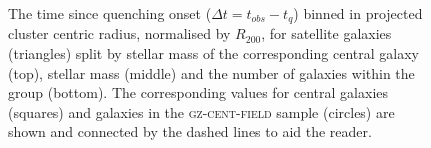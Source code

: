 \begin{figure}
{\caption[The time since quenching of the \textsc{gz-group} sample with projected cluster centric radius]{The time since quenching onset ($\Delta t = t_{obs} - t_{q}$) binned in projected cluster centric radius, normalised by $R_{200}$, for satellite galaxies (triangles) split by stellar mass of the corresponding central galaxy (top), stellar mass (middle) and the number of galaxies within the group (bottom). The corresponding values for central galaxies (squares) and galaxies in the \textsc{gz-cent-field} sample (circles) are shown and connected by the dashed lines to aid the reader.}
\label{fig:timesinceradius}}
\end{figure}

\begin{figure}
\end{figure}
